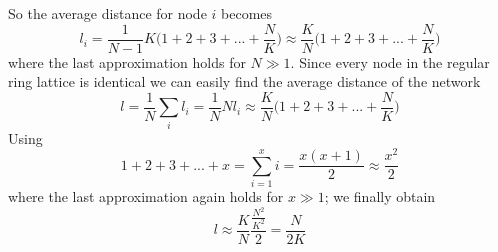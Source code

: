 \documentclass[11 pt , letterpaper , twoside , openright]{book}
\begin{document}
So the average distance for node $i$ becomes \cite{chap9}
\begin{equation}
	l_i = \frac{1}{N-1} K \bigg(1 + 2 + 3 + ... + \frac{N}{K} \bigg) \approx \frac{K}{N} \bigg(1 + 2 + 3 + ... + \frac{N}{K} \bigg)
\end{equation}
where the last approximation holds for $N \gg 1$. Since every node in the regular ring lattice is identical we can easily find the average distance of the network \cite{chap9}
\begin{equation}
	l = \frac{1}{N} \sum_i l_i = \frac{1}{N} N l_i \approx \frac{K}{N} \bigg(1 + 2 + 3 + ... + \frac{N}{K} \bigg)
\end{equation}
Using \cite{chap9}
\begin{equation}
	1 + 2+ 3 +...+ x = \sum_{i = 1}^x i = \frac{x(x+1)}{2} \approx \frac{x^2}{2}
\end{equation}
where the last approximation again holds for $x \gg 1$; we finally obtain \cite{chap9}
\begin{equation}
	l \approx \frac{K}{N} \frac{\frac{N^2}{K^2}}{2} = \frac{N}{2K}
\end{equation}

\newpage
\backmatter

\end{document}
